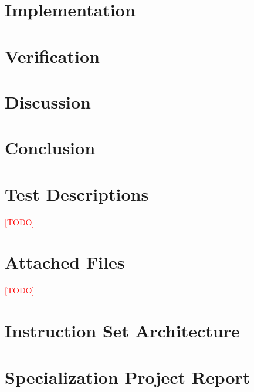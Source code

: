 \documentclass[a4paper,twoside,12pt]{book}
\newcommand\TODO{\textcolor{red}{[TODO]}}
\begin{document}
\chapter{Implementation}
    \label{ch:implementation}
    

\chapter{Verification}
    \label{ch:verification}
    

\chapter{Discussion}
    \label{ch:discussion}
    

\chapter{Conclusion}
    \label{ch:conclusion}
    

\cleardoublepage
{}
{}



\appendix

\chapter{Test Descriptions}

\TODO

\chapter{Attached Files}

\TODO

\chapter{Instruction Set Architecture}

%

\chapter{Specialization Project Report}

%
\end{document}
